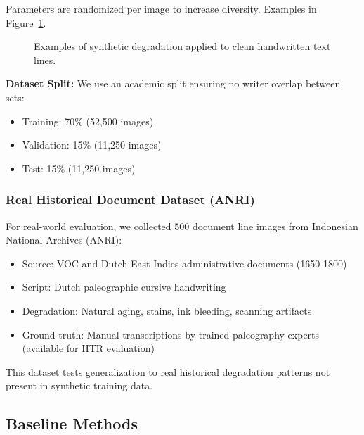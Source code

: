 \documentclass[journal]{IEEEtran}
\begin{document}
Parameters are randomized per image to increase diversity. Examples in Figure~\ref{fig:synthetic_examples}.

\begin{figure}[!t]
\centering
\caption{Examples of synthetic degradation applied to clean handwritten text lines.}
\label{fig:synthetic_examples}
\end{figure}

\textbf{Dataset Split:} We use an academic split ensuring no writer overlap between sets:
\begin{itemize}
    \item Training: 70\% (52,500 images)
    \item Validation: 15\% (11,250 images)
    \item Test: 15\% (11,250 images)
\end{itemize}

\subsubsection{Real Historical Document Dataset (ANRI)}

For real-world evaluation, we collected 500 document line images from Indonesian National Archives (ANRI):
\begin{itemize}
    \item Source: VOC and Dutch East Indies administrative documents (1650-1800)
    \item Script: Dutch paleographic cursive handwriting
    \item Degradation: Natural aging, stains, ink bleeding, scanning artifacts
    \item Ground truth: Manual transcriptions by trained paleography experts (available for HTR evaluation)
\end{itemize}

This dataset tests generalization to real historical degradation patterns not present in synthetic training data.

\subsection{Baseline Methods}
\end{document}
